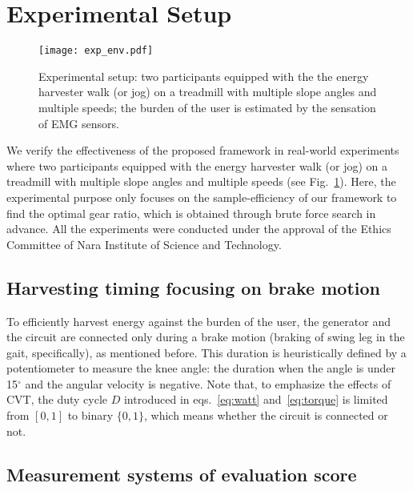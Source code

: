 \documentclass[twocolumn]{svjour3}          %
\begin{document}
\section{Experimental Setup}
\label{sec:setup}

\begin{figure}[tb]
    \centering
    \texttt{[image: exp\_env.pdf]}
    \caption{Experimental setup:
    two participants equipped with the the energy harvester walk (or jog) on a treadmill with multiple slope angles and multiple speeds;
    the burden of the user is estimated by the sensation of EMG sensors.
    }
    \label{fig:exp_env}
\end{figure}

We verify the effectiveness of the proposed framework in real-world experiments where two participants equipped with the energy harvester walk (or jog) on a treadmill with multiple slope angles and multiple speeds (see Fig.~\ref{fig:exp_env}).
Here, the experimental purpose only focuses on the sample-efficiency of our framework to find the optimal gear ratio, which is obtained through brute force search in advance.
All the experiments were conducted under the approval of the Ethics Committee of Nara Institute of Science and Technology.

\subsection{Harvesting timing focusing on brake motion}

To efficiently harvest energy against the burden of the user, the generator and the circuit are connected only during a brake motion (braking of swing leg in the gait, specifically), as mentioned before.
This duration is heuristically defined by a potentiometer to measure the knee angle: the duration when the angle is under 15$^\circ$ and the angular velocity is negative.
Note that, to emphasize the effects of CVT, the duty cycle $D$ introduced in eqs.~\eqref{eq:watt} and~\eqref{eq:torque} is limited from $[0, 1]$ to binary $\{0, 1\}$, which means whether the circuit is connected or not.

\subsection{Measurement systems of evaluation score}
\label{subsec:score}
\end{document}
